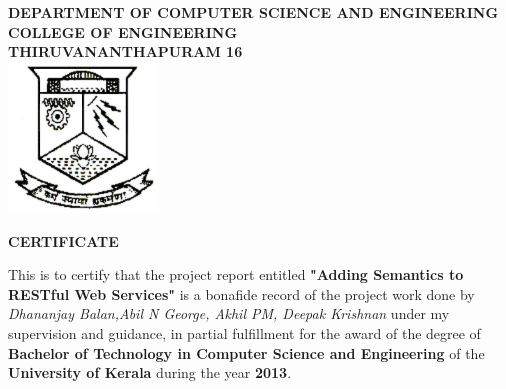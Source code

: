 \documentclass[12pt]{report}
\begin{document}


\newpage
\thispagestyle{empty}
\begin{center}
\textsc{{\textbf{DEPARTMENT OF COMPUTER SCIENCE AND ENGINEERING}}}\\
\vspace{1mm}
\textsc{\textbf{COLLEGE OF ENGINEERING}}\\
\vspace{1mm}
\textsc{\textbf{THIRUVANANTHAPURAM 16}}\\
\vspace{6mm}
\includegraphics[width=0.3\textwidth]{images/cet_logo.jpg}\\
\vspace{10mm}

\textbf{CERTIFICATE}
\vspace{4mm}
\end{center}
\begin{spacing}{1.5}
This is to certify that the project report entitled {\bf "Adding Semantics to RESTful Web Services"} is a bonafide record of the project work done by {\it Dhananjay Balan,Abil N George, Akhil PM, Deepak Krishnan}  under my supervision and guidance, in partial fulfillment for the award of the degree of {\bf Bachelor of Technology in Computer Science and Engineering} of the {\bf University of Kerala} during the year {\bf 2013}.\\
\end{spacing}
\vspace{5mm}
\\
\vspace{8mm} \\
 \\
 \\
 \\
 \\
 \\
 \\
\end{document}
